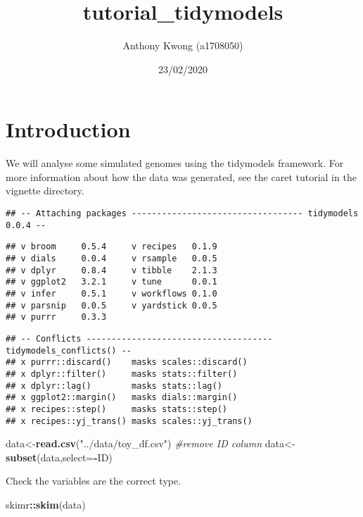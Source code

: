 \documentclass[]{article}
\title{tutorial\_tidymodels}
\author{Anthony Kwong (a1708050)}
\date{23/02/2020}
\newenvironment{Shaded}{\begin{snugshade}}{\end{snugshade}}
\newcommand{\CommentTok}[1]{\textcolor[rgb]{0.56,0.35,0.01}{\textit{#1}}}
\newcommand{\DataTypeTok}[1]{\textcolor[rgb]{0.13,0.29,0.53}{#1}}
\newcommand{\KeywordTok}[1]{\textcolor[rgb]{0.13,0.29,0.53}{\textbf{#1}}}
\newcommand{\NormalTok}[1]{#1}
\newcommand{\OperatorTok}[1]{\textcolor[rgb]{0.81,0.36,0.00}{\textbf{#1}}}
\newcommand{\StringTok}[1]{\textcolor[rgb]{0.31,0.60,0.02}{#1}}
\begin{document}
\maketitle

\hypertarget{introduction}{%
\section{Introduction}\label{introduction}}

We will analyse some simulated genomes using the tidymodels framework.
For more information about how the data was generated, see the caret
tutorial in the vignette directory.

\begin{verbatim}
## -- Attaching packages ---------------------------------- tidymodels 0.0.4 --
\end{verbatim}

\begin{verbatim}
## v broom     0.5.4     v recipes   0.1.9
## v dials     0.0.4     v rsample   0.0.5
## v dplyr     0.8.4     v tibble    2.1.3
## v ggplot2   3.2.1     v tune      0.0.1
## v infer     0.5.1     v workflows 0.1.0
## v parsnip   0.0.5     v yardstick 0.0.5
## v purrr     0.3.3
\end{verbatim}

\begin{verbatim}
## -- Conflicts ------------------------------------- tidymodels_conflicts() --
## x purrr::discard()    masks scales::discard()
## x dplyr::filter()     masks stats::filter()
## x dplyr::lag()        masks stats::lag()
## x ggplot2::margin()   masks dials::margin()
## x recipes::step()     masks stats::step()
## x recipes::yj_trans() masks scales::yj_trans()
\end{verbatim}

\begin{Shaded}
\begin{Highlighting}[]
\NormalTok{data<-}\KeywordTok{read.csv}\NormalTok{(}\StringTok{"../data/toy_df.csv"}\NormalTok{)}
\CommentTok{#remove ID column}
\NormalTok{data<-}\KeywordTok{subset}\NormalTok{(data,}\DataTypeTok{select=}\OperatorTok{-}\NormalTok{ID)}
\end{Highlighting}
\end{Shaded}

Check the variables are the correct type.

\begin{Shaded}
\begin{Highlighting}[]
\NormalTok{skimr}\OperatorTok{::}\KeywordTok{skim}\NormalTok{(data)}
\end{Highlighting}
\end{Shaded}
\end{document}
